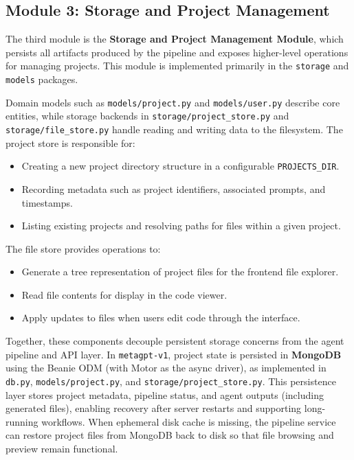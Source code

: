 \subsection{Module 3: Storage and Project Management}

The third module is the \textbf{Storage and Project Management Module}, which persists all artifacts produced by the pipeline and exposes higher-level operations for managing projects. This module is implemented primarily in the \texttt{storage} and \texttt{models} packages.

Domain models such as \texttt{models/project.py} and \texttt{models/user.py} describe core entities, while storage backends in \texttt{storage/project\_store.py} and \texttt{storage/file\_store.py} handle reading and writing data to the filesystem. The project store is responsible for:
\begin{itemize}
    \item Creating a new project directory structure in a configurable \texttt{PROJECTS\_DIR}.
    \item Recording metadata such as project identifiers, associated prompts, and timestamps.
    \item Listing existing projects and resolving paths for files within a given project.
\end{itemize}

The file store provides operations to:
\begin{itemize}
    \item Generate a tree representation of project files for the frontend file explorer.
    \item Read file contents for display in the code viewer.
    \item Apply updates to files when users edit code through the interface.
\end{itemize}

Together, these components decouple persistent storage concerns from the agent pipeline and API layer. In \texttt{metagpt-v1}, project state is persisted in \textbf{MongoDB} using the Beanie ODM (with Motor as the async driver), as implemented in \texttt{db.py}, \texttt{models/project.py}, and \texttt{storage/project\_store.py}. This persistence layer stores project metadata, pipeline status, and agent outputs (including generated files), enabling recovery after server restarts and supporting long-running workflows. When ephemeral disk cache is missing, the pipeline service can restore project files from MongoDB back to disk so that file browsing and preview remain functional.

